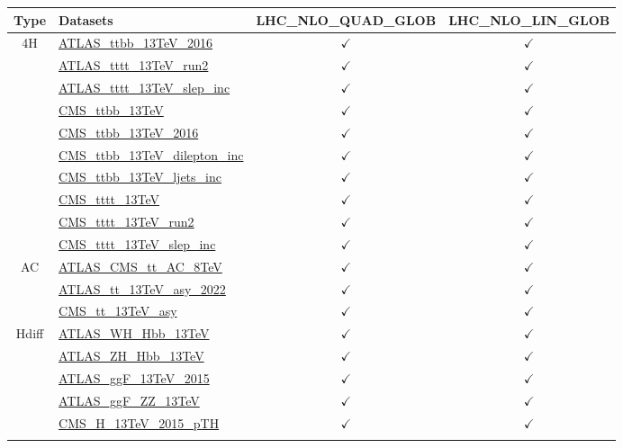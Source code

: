\documentclass{article}
\begin{document}
\begin{longtable}{|c|l|c|c|}
\hline
\footnotesize
 Type & Datasets  & LHC_NLO_QUAD_GLOB & LHC_NLO_LIN_GLOB \\ \hline
\multirow{10}{*}{4H}
 & \href{https://arxiv.org}{ATLAS_ttbb_13TeV_2016}  & $\checkmark$ & $\checkmark$\\ \cline{2-4}
 & \href{https://arxiv.org}{ATLAS_tttt_13TeV_run2}  & $\checkmark$ & $\checkmark$\\ \cline{2-4}
 & \href{https://arxiv.org}{ATLAS_tttt_13TeV_slep_inc}  & $\checkmark$ & $\checkmark$\\ \cline{2-4}
 & \href{https://arxiv.org}{CMS_ttbb_13TeV}  & $\checkmark$ & $\checkmark$\\ \cline{2-4}
 & \href{https://arxiv.org}{CMS_ttbb_13TeV_2016}  & $\checkmark$ & $\checkmark$\\ \cline{2-4}
 & \href{https://arxiv.org}{CMS_ttbb_13TeV_dilepton_inc}  & $\checkmark$ & $\checkmark$\\ \cline{2-4}
 & \href{https://arxiv.org}{CMS_ttbb_13TeV_ljets_inc}  & $\checkmark$ & $\checkmark$\\ \cline{2-4}
 & \href{https://arxiv.org}{CMS_tttt_13TeV}  & $\checkmark$ & $\checkmark$\\ \cline{2-4}
 & \href{https://arxiv.org}{CMS_tttt_13TeV_run2}  & $\checkmark$ & $\checkmark$\\ \cline{2-4}
 & \href{https://arxiv.org}{CMS_tttt_13TeV_slep_inc}  & $\checkmark$ & $\checkmark$
\\ \hline
\multirow{3}{*}{AC}
 & \href{https://arxiv.org}{ATLAS_CMS_tt_AC_8TeV}  & $\checkmark$ & $\checkmark$\\ \cline{2-4}
 & \href{https://arxiv.org}{ATLAS_tt_13TeV_asy_2022}  & $\checkmark$ & $\checkmark$\\ \cline{2-4}
 & \href{https://arxiv.org}{CMS_tt_13TeV_asy}  & $\checkmark$ & $\checkmark$
\\ \hline
\multirow{7}{*}{Hdiff}
 & \href{https://arxiv.org}{ATLAS_WH_Hbb_13TeV}  & $\checkmark$ & $\checkmark$\\ \cline{2-4}
 & \href{https://arxiv.org}{ATLAS_ZH_Hbb_13TeV}  & $\checkmark$ & $\checkmark$\\ \cline{2-4}
 & \href{https://arxiv.org}{ATLAS_ggF_13TeV_2015}  & $\checkmark$ & $\checkmark$\\ \cline{2-4}
 & \href{https://arxiv.org}{ATLAS_ggF_ZZ_13TeV}  & $\checkmark$ & $\checkmark$\\ \cline{2-4}
 & \href{https://arxiv.org}{CMS_H_13TeV_2015_pTH}  & $\checkmark$ & $\checkmark$\\ \cline{2-4}

\end{longtable}
\end{document}

